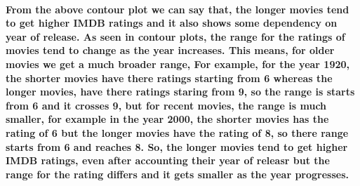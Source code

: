 \documentclass[
]{article}
\begin{document}
{\paragraph{From the above contour plot we can say that, the longer
movies tend to get higher IMDB ratings and it also shows some dependency
on year of release. As seen in contour plots, the range for the ratings
of movies tend to change as the year increases. This means, for older
movies we get a much broader range, For example, for the year 1920, the
shorter movies have there ratings starting from 6 whereas the longer
movies, have there ratings staring from 9, so the range is starts from 6
and it crosses 9, but for recent movies, the range is much smaller, for
example in the year 2000, the shorter movies has the rating of 6 but the
longer movies have the rating of 8, so there range starts from 6 and
reaches 8. So, the longer movies tend to get higher IMDB ratings, even
after accounting their year of releasr but the range for the rating
differs and it gets smaller as the year
progresses.}\label{from-the-above-contour-plot-we-can-say-that-the-longer-movies-tend-to-get-higher-imdb-ratings-and-it-also-shows-some-dependency-on-year-of-release.-as-seen-in-contour-plots-the-range-for-the-ratings-of-movies-tend-to-change-as-the-year-increases.-this-means-for-older-movies-we-get-a-much-broader-range-for-example-for-the-year-1920-the-shorter-movies-have-there-ratings-starting-from-6-whereas-the-longer-movies-have-there-ratings-staring-from-9-so-the-range-is-starts-from-6-and-it-crosses-9-but-for-recent-movies-the-range-is-much-smaller-for-example-in-the-year-2000-the-shorter-movies-has-the-rating-of-6-but-the-longer-movies-have-the-rating-of-8-so-there-range-starts-from-6-and-reaches-8.-so-the-longer-movies-tend-to-get-higher-imdb-ratings-even-after-accounting-their-year-of-releasr-but-the-range-for-the-rating-differs-and-it-gets-smaller-as-the-year-progresses.}}
\end{document}
